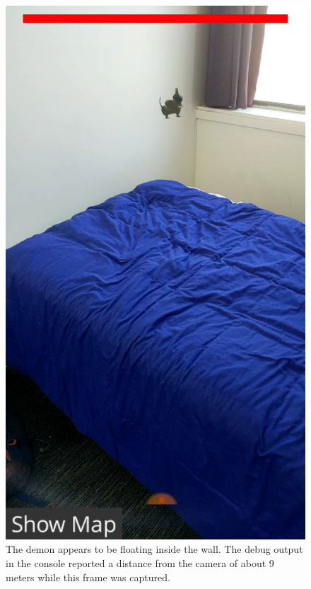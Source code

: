 \begin{figure}
    \includegraphics[width=\textwidth]{graphics/demon-wrong-depth.jpg}
    \caption{The demon appears to be floating inside the wall. The debug output in the console reported a distance from the camera of about 9 meters while this frame was captured.}
    \label{fig:demon_wrong_depth}
\end{figure}


